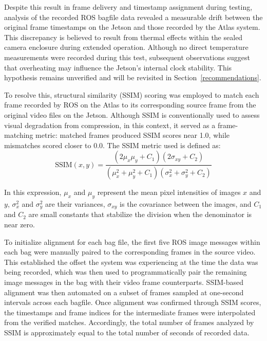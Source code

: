 \documentclass{erauthesis}
\begin{document}
Despite this result in frame delivery and timestamp assignment during testing, analysis of the recorded ROS bagfile data revealed a measurable drift between the original frame timestamps on the Jetson and those recorded by the Atlas system. 
This discrepancy is believed to result from thermal effects within the sealed camera enclosure during extended operation. 
Although no direct temperature measurements were recorded during this test, subsequent observations suggest that overheating may influence the Jetson's internal clock stability. 
This hypothesis remains unverified and will be revisited in Section~\ref{recommendations}.

To resolve this, structural similarity (SSIM) scoring was employed to match each frame recorded by ROS on the Atlas to its corresponding source frame from the original video files on the Jetson. 
Although SSIM is conventionally used to assess visual degradation from compression, in this context, it served as a frame-matching metric: matched frames produced SSIM scores near 1.0, while mismatches scored closer to 0.0. The SSIM metric used is defined as:
\begin{equation}
    \text{SSIM}(x, y) = \frac{(2\mu_x\mu_y + C_1)(2\sigma_{xy} + C_2)}{(\mu_x^2 + \mu_y^2 + C_1)(\sigma_x^2 + \sigma_y^2 + C_2)}
\end{equation}

In this expression, $\mu_x$ and $\mu_y$ represent the mean pixel intensities of images $x$ and $y$, $\sigma_x^2$ and $\sigma_y^2$ are their variances, $\sigma_{xy}$ is the covariance between the images, and $C_1$ and $C_2$ are small constants that stabilize the division when the denominator is near zero.

To initialize alignment for each bag file, the first five ROS image messages within each bag were manually paired to the corresponding frames in the source video.
This established the offset the system was experiencing at the time the data was being recorded, which was then used to programmatically pair the remaining image messages in the bag with their video frame counterparts.
SSIM-based alignment was then automated on a subset of frames sampled at one-second intervals across each bagfile. 
Once alignment was confirmed through SSIM scores, the timestamps and frame indices for the intermediate frames were interpolated from the verified matches. 
Accordingly, the total number of frames analyzed by SSIM is approximately equal to the total number of seconds of recorded data.
\end{document}
